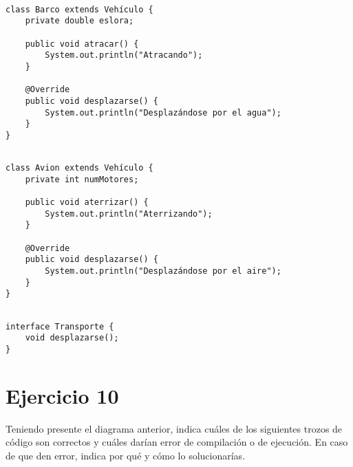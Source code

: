 \documentclass[a4paper,12pt]{article}
\begin{document}
\begin{lstlisting}[style=customjava, caption={Clase Barco} ]

class Barco extends Vehículo {
    private double eslora;

    public void atracar() {
        System.out.println("Atracando");
    }

    @Override
    public void desplazarse() {
        System.out.println("Desplazándose por el agua");
    }
}

\end{lstlisting}


\begin{lstlisting}[style=customjava, caption={Clase Avion} ]

class Avion extends Vehículo {
    private int numMotores;

    public void aterrizar() {
        System.out.println("Aterrizando");
    }

    @Override
    public void desplazarse() {
        System.out.println("Desplazándose por el aire");
    }
}

\end{lstlisting}

\begin{lstlisting}[style=customjava, caption={Interfaz Transporte} ]
    
interface Transporte {
    void desplazarse();
}

\end{lstlisting}

\section{Ejercicio 10}

Teniendo presente el diagrama anterior, indica cuáles de los siguientes trozos de código
son correctos y cuáles darían error de compilación o de ejecución. En caso de que den error,
indica por qué y cómo lo solucionarías.
\end{document}

